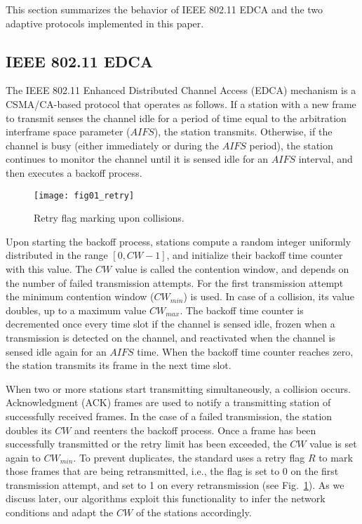 \documentclass[a4paper,10pt]{article}
\newcommand{\revs}[1]{\textcolor{black}{#1}}
\begin{document}
This section summarizes the behavior of IEEE 802.11 EDCA \revs{\cite{80211revised}} and the two adaptive protocols implemented in this paper. 

\subsection{IEEE 802.11 EDCA}

The IEEE 802.11 Enhanced Distributed Channel Access (EDCA) mechanism \revs{\cite{80211revised}} is a CSMA/CA-based protocol that operates as follows. If a station with a new frame to transmit senses the channel idle for a period of time equal to the arbitration interframe space parameter ($AIFS$), the station transmits. Otherwise, if the channel is busy (either immediately or during the $AIFS$ period), the station continues to monitor the channel until it is sensed idle for an $AIFS$ interval, and then executes a backoff process.

\begin{figure}
\centerline{\texttt{[image: fig01\_retry]}}
\caption{Retry flag marking upon collisions.}
\label{fig:retry}
\end{figure}

Upon starting the backoff process, stations compute a random integer uniformly distributed in the range $[0,CW-1]$, and initialize their backoff time counter with this value. The $CW$ value is called the contention window, and depends on the number of failed transmission attempts. For the first transmission attempt the minimum contention window ($CW_{min}$) is used. In case of a collision, its value doubles, up to a maximum value $CW_{max}$. The backoff time counter is decremented once every time slot if the channel is sensed idle, frozen when a transmission is detected on the channel, and reactivated when the channel is sensed idle again for an $AIFS$ time. When the backoff time counter reaches zero, the station transmits its frame in the next time slot. 

When two or more stations start transmitting simultaneously, a collision occurs. Acknowledgment (ACK) frames are used to notify a transmitting station of successfully received frames. In the case of a failed transmission, the station doubles its $CW$ and reenters the backoff process. Once a frame has been successfully transmitted or the retry limit has been exceeded, the $CW$ value is set again to $CW_{min}$. To prevent duplicates, the standard uses a retry flag $R$ to mark those frames that are being retransmitted, i.e., the flag is set to 0 on the first transmission attempt, and set to 1 on every retransmission (see Fig.~\ref{fig:retry}). As we discuss later, our algorithms exploit this functionality to infer the network conditions and adapt the $CW$ of the stations accordingly. 
\end{document}
